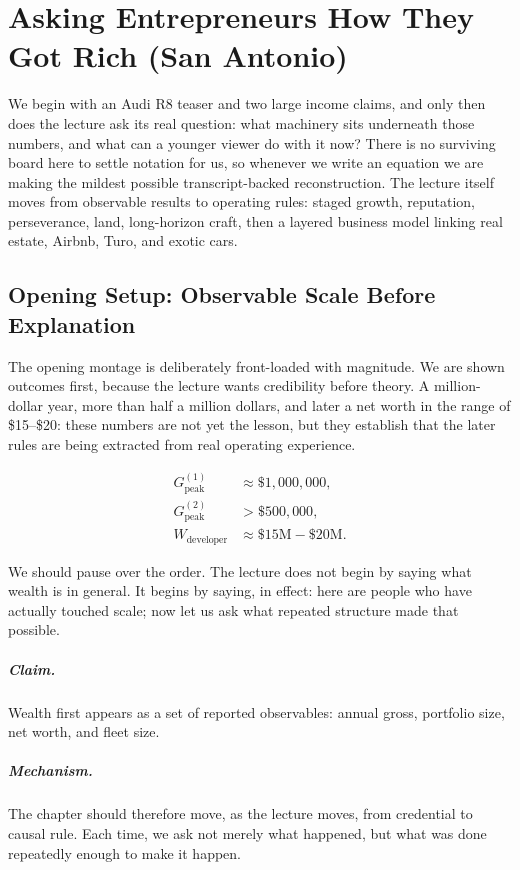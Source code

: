 \chapter{Asking Entrepreneurs How They Got Rich (San Antonio)}

We begin with an Audi R8 teaser and two large income claims, and only then does the lecture ask its real question: what machinery sits underneath those numbers, and what can a younger viewer do with it now? There is no surviving board here to settle notation for us, so whenever we write an equation we are making the mildest possible transcript-backed reconstruction. The lecture itself moves from observable results to operating rules: staged growth, reputation, perseverance, land, long-horizon craft, then a layered business model linking real estate, Airbnb, Turo, and exotic cars.

\section{Opening Setup: Observable Scale Before Explanation}

The opening montage is deliberately front-loaded with magnitude. We are shown outcomes first, because the lecture wants credibility before theory. A million-dollar year, more than half a million dollars, and later a net worth in the range of \$15--\$20: these numbers are not yet the lesson, but they establish that the later rules are being extracted from real operating experience.

\begin{align}
G_{\text{peak}}^{(1)} &\approx \$1{,}000{,}000,\\
G_{\text{peak}}^{(2)} &> \$500{,}000,\\
W_{\text{developer}} &\approx \$15\text{M}-\$20\text{M}.
\end{align}

We should pause over the order. The lecture does not begin by saying what wealth is in general. It begins by saying, in effect: here are people who have actually touched scale; now let us ask what repeated structure made that possible.

\paragraph{Claim.} Wealth first appears as a set of reported observables: annual gross, portfolio size, net worth, and fleet size.

\paragraph{Mechanism.} The chapter should therefore move, as the lecture moves, from credential to causal rule. Each time, we ask not merely what happened, but what was done repeatedly enough to make it happen.

